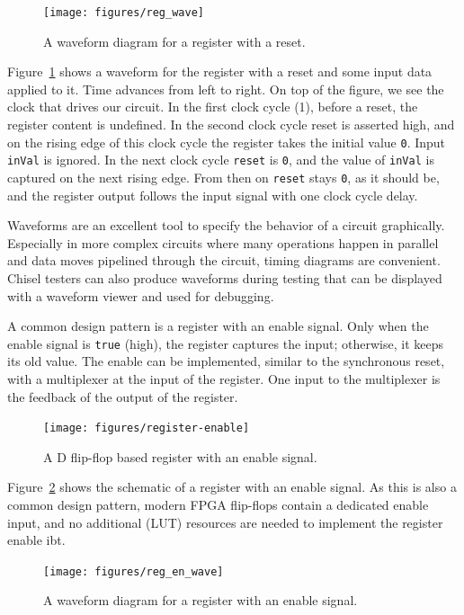 \documentclass[%
    10pt,
    headinclude, footexclude,
    openright, %
    notitlepage,
    cleardoubleempty,
    headsepline,
    pointlessnumbers,
    bibtotoc, idxtotoc,
    ]{scrbook}
\newcommand{\code}[1]{{\lstinline[basicstyle=\small\ttfamily]{#1}}}
\begin{document}

\begin{figure}
  \centering
  \texttt{[image: figures/reg\_wave]}
  \caption{A waveform diagram for a register with a reset.}
  \label{fig:register-wave}
\end{figure}

Figure~\ref{fig:register-wave} shows a waveform for the register with a reset
and some input data applied to it.
Time advances from left to right. On top of the figure, we see the clock that drives our circuit.
In the first clock cycle (1), before a reset, the register content is undefined.
In the second clock cycle reset is asserted high, and on the rising edge of this clock cycle the register
takes the initial value \code{0}. Input \code{inVal} is ignored. In the next clock cycle
\code{reset} is \code{0}, and the value of \code{inVal} is captured on the next rising
edge. From then on \code{reset} stays \code{0}, as it should be, and the
register output follows the input signal with one clock cycle delay.

Waveforms are an excellent tool to specify the behavior of a circuit graphically.
Especially in more complex circuits where many operations happen in parallel
and data moves pipelined through the circuit, timing diagrams are convenient.
Chisel testers can also produce waveforms during testing that can be displayed
with a waveform viewer and used for debugging.

A common design pattern is a register with an enable signal. Only when the enable signal
is \code{true} (high), the register captures the input; otherwise, it keeps its old value.
The enable can be implemented, similar to the synchronous reset, with
a multiplexer at the input of the register. One input to the multiplexer is the feedback of the
output of the register.

\begin{figure}
  \centering
  \texttt{[image: figures/register-enable]}
  \caption{A D flip-flop based register with an enable signal.}
  \label{fig:register-enable}
\end{figure}

Figure~\ref{fig:register-enable} shows the schematic of a register with an enable signal.
As this is also a common design pattern, modern FPGA flip-flops contain a
dedicated enable input, and no additional (LUT) resources are needed to implement
the register enable ibt.

\begin{figure}
  \centering
  \texttt{[image: figures/reg\_en\_wave]}
  \caption{A waveform diagram for a register with an enable signal.}
  \label{fig:register-en-wave}
\end{figure}
\end{document}
